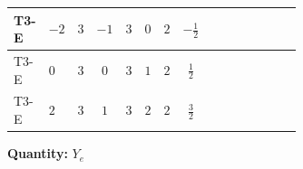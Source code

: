 \documentclass[8pt]{article}
\begin{document}
\begin{landscape}
\begin{longtable}{@{}llcccccc >{\raggedright\arraybackslash}p{0.21\linewidth} >{\raggedright\arraybackslash}p{0.21\linewidth} >{\raggedright\arraybackslash}p{0.21\linewidth}@{}}
\midrule
T3-E & $-2$ & $3$ & $-1$ & $3$ & $0$ & $2$ & $-\frac{1}{2}$ & \scriptsize\adjustbox{max width=\linewidth}{$\begin{gathered} 3 \operatorname{Tr}\!\left({Y_d}\,\left({Y_d}\right)^{\dagger}\right) \left({Y_e}\right)_{ij}\end{gathered}$} & \scriptsize\adjustbox{max width=\linewidth}{$\begin{gathered} +3 \operatorname{Tr}\!\left({Y_u}\,\left({Y_u}\right)^{\dagger}\right) \left({Y_e}\right)_{ij}\end{gathered}$} & \scriptsize\adjustbox{max width=\linewidth}{$\begin{gathered} +\operatorname{Tr}\!\left({Y_e}\,\left({Y_e}\right)^{\dagger}\right) \left({Y_e}\right)_{ij}\end{gathered}$} \\
\midrule
T3-E & $0$ & $3$ & $0$ & $3$ & $1$ & $2$ & $\frac{1}{2}$ & \scriptsize\adjustbox{max width=\linewidth}{$\begin{gathered} 3 \operatorname{Tr}\!\left({Y_d}\,\left({Y_d}\right)^{\dagger}\right) \left({Y_e}\right)_{ij}\end{gathered}$} & \scriptsize\adjustbox{max width=\linewidth}{$\begin{gathered} +3 \operatorname{Tr}\!\left({Y_u}\,\left({Y_u}\right)^{\dagger}\right) \left({Y_e}\right)_{ij}\end{gathered}$} & \scriptsize\adjustbox{max width=\linewidth}{$\begin{gathered} +\operatorname{Tr}\!\left({Y_e}\,\left({Y_e}\right)^{\dagger}\right) \left({Y_e}\right)_{ij}\end{gathered}$} \\
\midrule
T3-E & $2$ & $3$ & $1$ & $3$ & $2$ & $2$ & $\frac{3}{2}$ & \scriptsize\adjustbox{max width=\linewidth}{$\begin{gathered} 3 \operatorname{Tr}\!\left({Y_d}\,\left({Y_d}\right)^{\dagger}\right) \left({Y_e}\right)_{ij}\end{gathered}$} & \scriptsize\adjustbox{max width=\linewidth}{$\begin{gathered} +3 \operatorname{Tr}\!\left({Y_u}\,\left({Y_u}\right)^{\dagger}\right) \left({Y_e}\right)_{ij}\end{gathered}$} & \scriptsize\adjustbox{max width=\linewidth}{$\begin{gathered} +\operatorname{Tr}\!\left({Y_e}\,\left({Y_e}\right)^{\dagger}\right) \left({Y_e}\right)_{ij}\end{gathered}$} \\
\midrule
\bottomrule
\end{longtable}
\clearpage
\noindent\textbf{Quantity: }$Y_e$\par\smallskip

\end{landscape}
\end{document}
